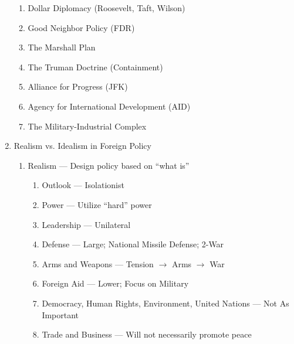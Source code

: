\documentclass[12pt]{article}
\begin{document}
\begin{enumerate}
\begin{enumerate}
          \item Dollar Diplomacy (Roosevelt, Taft, Wilson)

          \item Good Neighbor Policy (FDR)

          \item The Marshall Plan

          \item The Truman Doctrine (Containment)

          \item Alliance for Progress (JFK)

          \item Agency for International Development (AID)

          \item The Military-Industrial Complex

        \end{enumerate}

      \item Realism vs. Idealism in Foreign Policy

        \begin{enumerate}

          \item Realism — Design policy based on “what is”

            \begin{enumerate}

              \item Outlook — Isolationist

              \item Power — Utilize “hard” power

              \item Leadership — Unilateral

              \item Defense — Large; National Missile Defense; 2-War

              \item Arms and Weapons — Tension $\rightarrow$ Arms $\rightarrow$ War

              \item Foreign Aid — Lower; Focus on Military

              \item Democracy, Human Rights, Environment, United Nations — Not As Important

              \item Trade and Business — Will not necessarily promote peace


\end{enumerate}
\end{enumerate}
\end{enumerate}
\end{document}
